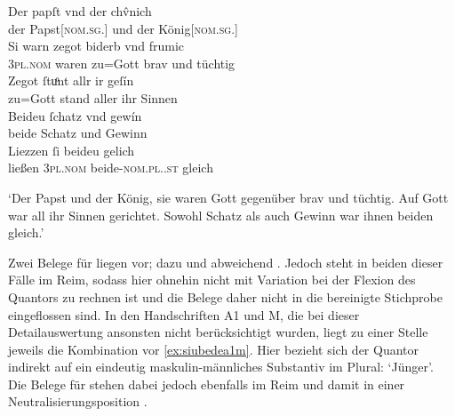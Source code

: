 \begin{exe}
\ex\label{ex:papstkoenig3} %
	\gll Der papſt vnd der chv̂nich \\
		der Papst[\textsc{nom.sg.\MascM}] und der König[\textsc{nom.sg.\MascM}] \\
\sn \gll Si warn zegot biderb vnd frumic \\
		\textsc{3pl\subM.nom} waren {zu=Gott} brav und tüchtig \\
\sn \gll Zegot ſtuͦnt allr ir geſín \\
		{zu=Gott} stand aller ihr Sinnen \\
\sn \gll Beideu ſchatz vnd gewín \\
		beide Schatz und Gewinn \\
\sn \gll Liezzen ſi beideu gelich \\
		ließen \textsc{3pl\subM.nom} beide-\textsc{nom.pl.\NeutM.st} gleich \\
	\begin{taggedline}{\parencites[\pno~17vb,30--34]{kc:B1}[vgl. abweichend][6110--6113]{schroeder1895}}
	\trans `Der Papst und der König, sie waren Gott gegenüber brav und
		tüchtig. Auf Gott war all ihr Sinnen gerichtet. Sowohl Schatz als auch
		Gewinn war ihnen beiden gleich.'
	\end{taggedline}
\end{exe}

Zwei Belege für  liegen \citet[\pno~21ra,25--31 und 22ra,34--22rb,6]{kc:VB} vor; dazu \citet[4255--4261]{schroeder1895} und
abweichend \citet[4455--4470]{schroeder1895}. Jedoch steht  in
beiden dieser Fälle im Reim, sodass hier ohnehin nicht mit Variation bei der
Flexion des Quantors zu rechnen ist und die Belege daher nicht in die
bereinigte Stichprobe eingeflossen sind. In den Handschriften A1 und
M, die bei dieser Detailauswertung ansonsten nicht berücksichtigt
wurden, liegt zu einer Stelle jeweils die Kombination  vor
\cref{ex:siubedea1m}. Hier bezieht sich der Quantor indirekt auf ein eindeutig
maskulin-männliches Substantiv im Plural:
 `Jünger'. Die Belege für  stehen dabei jedoch
ebenfalls im Reim und damit in einer Neutralisierungsposition
\autocites[vgl.][662--663]{grimm1870}[89]{askedal1973}.

